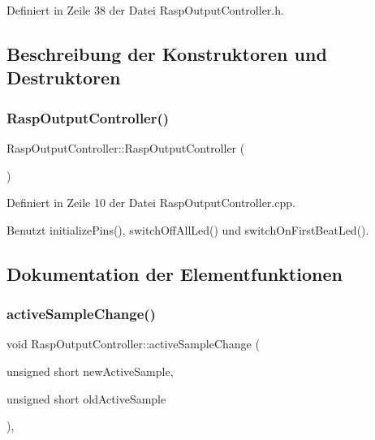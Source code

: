 Definiert in Zeile 38 der Datei Rasp\+Output\+Controller.\+h.



\subsection{Beschreibung der Konstruktoren und Destruktoren}
\mbox{\label{class_rasp_output_controller_afd7487de7ff81c6b092f4072d4fa80a5}} 
\subsubsection{\texorpdfstring{Rasp\+Output\+Controller()}{RaspOutputController()}}
{\footnotesize\ttfamily Rasp\+Output\+Controller\+::\+Rasp\+Output\+Controller (\begin{DoxyParamCaption}{ }\end{DoxyParamCaption})}



Definiert in Zeile 10 der Datei Rasp\+Output\+Controller.\+cpp.



Benutzt initialize\+Pins(), switch\+Off\+All\+Led() und switch\+On\+First\+Beat\+Led().



\subsection{Dokumentation der Elementfunktionen}
\mbox{\label{class_rasp_output_controller_a92954cf26d4dd5f7d8835d1d508302c0}} 
\subsubsection{\texorpdfstring{active\+Sample\+Change()}{activeSampleChange()}}
{\footnotesize\ttfamily void Rasp\+Output\+Controller\+::active\+Sample\+Change (\begin{DoxyParamCaption}\item[{unsigned short}]{new\+Active\+Sample,  }\item[{unsigned short}]{old\+Active\+Sample }\end{DoxyParamCaption})\hspace{0.3cm}{\ttfamily [override]}, {\ttfamily [virtual]}}



